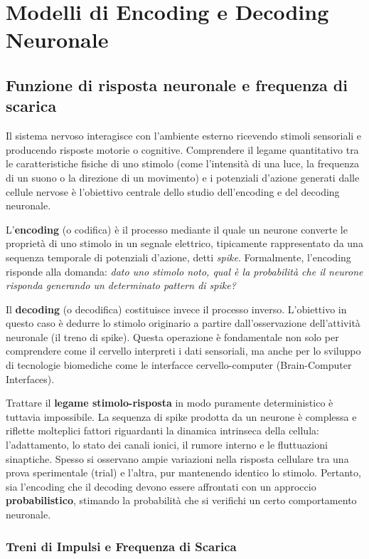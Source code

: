 \chapter{Modelli di Encoding e Decoding Neuronale}

\section{Funzione di risposta neuronale e frequenza di scarica}

Il sistema nervoso interagisce con l'ambiente esterno ricevendo stimoli sensoriali e producendo risposte motorie o cognitive. Comprendere il legame quantitativo tra le caratteristiche fisiche di uno stimolo (come l'intensità di una luce, la frequenza di un suono o la direzione di un movimento) e i potenziali d'azione generati dalle cellule nervose è l'obiettivo centrale dello studio dell'encoding e del decoding neuronale. 

L'\textbf{encoding} (o codifica) è il processo mediante il quale un neurone converte le proprietà di uno stimolo in un segnale elettrico, tipicamente rappresentato da una sequenza temporale di potenziali d'azione, detti \textit{spike}. Formalmente, l'encoding risponde alla domanda: \textit{dato uno stimolo noto, qual è la probabilità che il neurone risponda generando un determinato pattern di spike?}

Il \textbf{decoding} (o decodifica) costituisce invece il processo inverso. L'obiettivo in questo caso è dedurre lo stimolo originario a partire dall'osservazione dell'attività neuronale (il treno di spike). Questa operazione è fondamentale non solo per comprendere come il cervello interpreti i dati sensoriali, ma anche per lo sviluppo di tecnologie biomediche come le interfacce cervello-computer (Brain-Computer Interfaces). 

Trattare il \textbf{legame stimolo-risposta} in modo puramente deterministico è tuttavia impossibile. La sequenza di spike prodotta da un neurone è complessa e riflette molteplici fattori riguardanti la dinamica intrinseca della cellula: l'adattamento, lo stato dei canali ionici, il rumore interno e le fluttuazioni sinaptiche. Spesso si osservano ampie variazioni nella risposta cellulare tra una prova sperimentale (trial) e l'altra, pur mantenendo identico lo stimolo. Pertanto, sia l'encoding che il decoding devono essere affrontati con un approccio \textbf{probabilistico}, stimando la probabilità che si verifichi un certo comportamento neuronale.

\subsection{Treni di Impulsi e Frequenza di Scarica}

